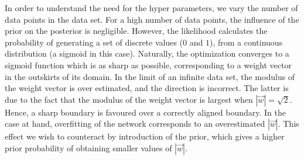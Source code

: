 \documentclass[pdftex,11pt,a4paper]{article}
\begin{document}
In order to understand the need for the hyper parameters, we vary the number of data points in the data set. For a high number of data points, the influence of the prior on the posterior is negligible. However, the likelihood calculates the probability of generating a set of discrete values ($0$ and $1$), from a continuous distribution (a sigmoid in this case). Naturally, the optimization converges to a sigmoid function which is as sharp as possible, corresponding to a weight vector in the outskirts of its domain. In the limit of an infinite data set, the modulus of the weight vector is over estimated, and the direction is incorrect. The latter is due to the fact that the modulus of the weight vector is largest when $|\vec{w}| = \sqrt{2}$. Hence, a sharp boundary is favoured over a correctly aligned boundary. In the case at hand, overfitting of the network corresponds to an overestimated $|\vec{w}|$. This effect we wish to counteract by introduction of the prior, which gives a higher prior probability of obtaining smaller values of $|\vec{w}|$.
\end{document}
